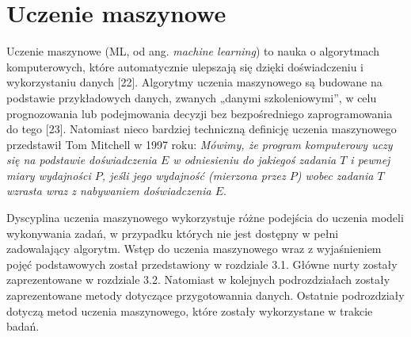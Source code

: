 %		
%
%
%
%

\chapter{Uczenie maszynowe}
\label{cha:ucz.masz}

Uczenie maszynowe (ML, od ang. \textit{machine learning}) to nauka o algorytmach komputerowych, które automatycznie ulepszają się dzięki doświadczeniu i wykorzystaniu danych [22]. Algorytmy uczenia maszynowego są budowane na podstawie przykładowych danych, zwanych „danymi szkoleniowymi”, w celu prognozowania lub podejmowania decyzji bez bezpośredniego zaprogramowania do tego [23]. Natomiast nieco bardziej techniczną definicję uczenia maszynowego przedstawił Tom Mitchell w 1997 roku: \textit{Mówimy, że program komputerowy uczy się na podstawie doświadczenia $E$ w odniesieniu do jakiegoś zadania $T$ i pewnej miary wydajności $P$, jeśli jego wydajność (mierzona przez $P$) wobec zadania $T$ wzrasta wraz z nabywaniem doświadczenia $E$}.

Dyscyplina uczenia maszynowego wykorzystuje różne podejścia do uczenia modeli wykonywania zadań, w przypadku których nie jest dostępny w pełni zadowalający algorytm. Wstęp do uczenia maszynowego wraz z wyjaśnieniem pojęć podstawowych został przedstawiony w rozdziale 3.1. Główne nurty zostały zaprezentowane w rozdziale 3.2. Natomiast w kolejnych podrozdziałach zostały zaprezentowane metody dotyczące przygotowannia danych. Ostatnie podrozdziały dotyczą metod  uczenia maszynowego, które zostały wykorzystane w trakcie badań.

